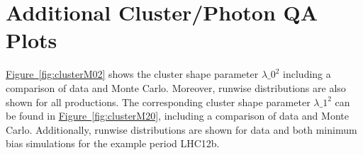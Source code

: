 %
%

\section{Additional Cluster/Photon QA Plots}
\label{chap:QAClusterShape}
\label{chap:extQALHC16}

\hyperref[fig:clusterM02]{Figure~\ref*{fig:clusterM02}} shows the cluster shape parameter $\lambda\_{0}^{2}$ including a comparison of data and Monte Carlo.
Moreover, runwise distributions are also shown for all productions.
The corresponding cluster shape parameter $\lambda\_{1}^{2}$ can be found in \hyperref[fig:clusterM20]{Figure~\ref*{fig:clusterM20}}, including a comparison of data and Monte Carlo.
Additionally, runwise distributions are shown for data and both minimum bias simulations for the example period LHC12b.

